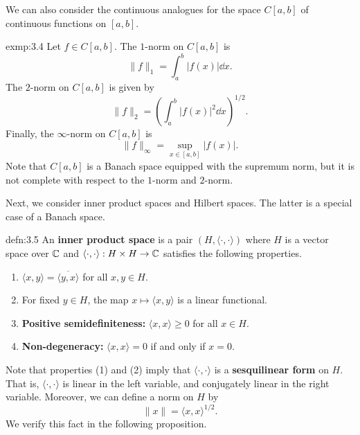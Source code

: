 We can also consider the continuous analogues for the space $C[a, b]$ 
of continuous functions on $[a, b]$.

\begin{exmp}{exmp:3.4}
    Let $f \in C[a, b]$. The $1$-norm on $C[a, b]$ is 
    \[ \|f\|_1 = \int_a^b |f(x)|\dd x. \] 
    The $2$-norm on $C[a, b]$ is given by 
    \[ \|f\|_2 = \left( \int_a^b |f(x)|^2\dd x \right)^{\!1/2}. \] 
    Finally, the $\infty$-norm on $C[a, b]$ is 
    \[ \|f\|_\infty = \sup_{x\in [a, b]} |f(x)|. \] 
    Note that $C[a, b]$ is a Banach space equipped with the supremum norm, 
    but it is not complete with respect to the $1$-norm and $2$-norm. 
\end{exmp}

Next, we consider inner product spaces and Hilbert spaces. The latter 
is a special case of a Banach space. 

\begin{defn}{defn:3.5} 
    An {\bf inner product space} is a pair $(H, \langle \cdot, \cdot \rangle)$ 
    where $H$ is a vector space over $\mathbb{C}$ and $\langle \cdot, \cdot \rangle
    : H \times H \to \mathbb{C}$ satisfies the following properties.
    \begin{enumerate}[(1)]
        \item $\langle x, y \rangle = \overline{\langle y, x \rangle}$
        for all $x, y \in H$. 
        \item For fixed $y \in H$, the map $x \mapsto \langle x, y \rangle$
        is a linear functional.
        \item {\bf Positive semidefiniteness:} $\langle x, x \rangle \geq 0$ 
        for all $x \in H$.
        \item {\bf Non-degeneracy:} $\langle x, x \rangle = 0$ if and only if 
        $x = 0$. 
    \end{enumerate} 
\end{defn}

Note that properties (1) and (2) imply that $\langle \cdot, \cdot \rangle$ 
is a {\bf sesquilinear form} on $H$. That is, $\langle \cdot, \cdot \rangle$ 
is linear in the left variable, and conjugately linear in the right 
variable. Moreover, we can define a norm on $H$ by 
\[ \|x\| = \langle x, x \rangle^{1/2}. \] 
We verify this fact in the following proposition. 

